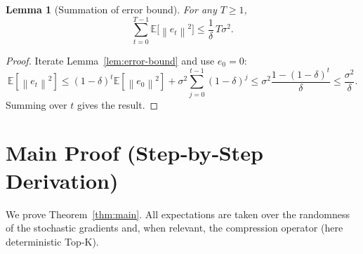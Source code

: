 \documentclass{article}
\newtheorem{lemma}{Lemma}
\newcommand{\E}{\mathbb{E}}
\newcommand{\norm}[1]{\left\lVert #1\right\rVert}
\begin{document}
\begin{lemma}[Summation of error bound]\label{lem:error-sum}
For any $T\ge1$,
\[
    \sum_{t=0}^{T-1}\E\!\bigl[\norm{e_{t}}^{2}\bigr]\le \frac{1}{\delta}\,T\sigma^{2}.
\]
\end{lemma}
\begin{proof}
Iterate Lemma~\ref{lem:error-bound} and use $e_{0}=0$:
\[
    \E[\norm{e_{t}}^{2}] \le (1-\delta)^{t}\E[\norm{e_{0}}^{2}]
        +\sigma^{2}\sum_{j=0}^{t-1}(1-\delta)^{j}
    \le \sigma^{2}\frac{1-(1-\delta)^{t}}{\delta}
    \le \frac{\sigma^{2}}{\delta}.
\]
Summing over $t$ gives the result.
\end{proof}

\newpage
\section*{Main Proof (Step‑by‑Step Derivation)}
We prove Theorem~\ref{thm:main}.  
All expectations are taken over the randomness of the stochastic gradients and, when relevant, the compression operator (here deterministic Top‑K).
\end{document}
